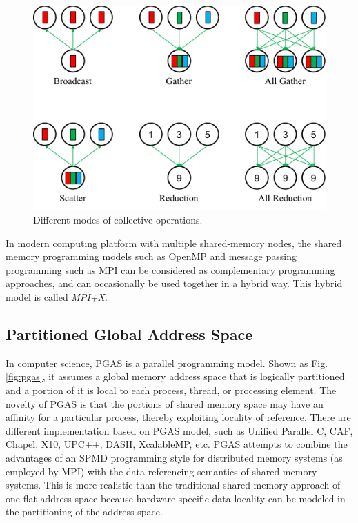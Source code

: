 \begin{figure}[t]
	\centering
	\includegraphics[width=0.99\linewidth]{fig/collective.pdf}
	\caption{Different modes of collective operations.}
	\label{mpi_collective}
\end{figure}

In modern computing platform with multiple shared-memory nodes, the shared memory programming models such as OpenMP and message passing programming such as MPI can be considered as complementary programming approaches, and can occasionally be used together in a hybrid way. This hybrid model is called \textit{MPI+X}.

\subsection{Partitioned Global Address Space}

In computer science, PGAS is a parallel programming model. Shown as Fig. \ref{fig:pgas}, it assumes a global memory address space that is logically partitioned and a portion of it is local to each process, thread, or processing element. The novelty of PGAS is that the portions of shared memory space may have an affinity for a particular process, thereby exploiting locality of reference. There are different implementation based on PGAS model, such as Unified Parallel C, CAF, Chapel, X10, UPC++, DASH, XcalableMP, etc. PGAS attempts to combine the advantages of an SPMD programming style for distributed memory systems (as employed by MPI) with the data referencing semantics of shared memory systems. This is more realistic than the traditional shared memory approach of one flat address space because hardware-specific data locality can be modeled in the partitioning of the address space.

